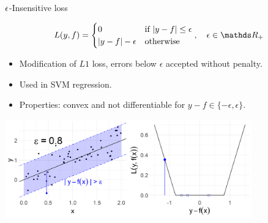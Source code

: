 \documentclass[11pt,compress,t,notes=noshow, xcolor=table]{beamer}
\begin{document}
\begin{vbframe}{$\epsilon$-Insensitive loss}

\vspace*{-0.3cm}
$$
L(y,f) =  \begin{cases}
  0  & \text{if } |y - f| \le \epsilon \\
  |y - f|-\epsilon & \text{otherwise }
  \end{cases}, \quad \epsilon \in \R_{+}
$$
\begin{itemize}
\item Modification of $L1$ loss, errors below $\epsilon$ accepted without penalty.
\item Used in SVM regression.
\item Properties: convex and not differentiable for $ y - f \in \{-\epsilon, \epsilon\}$.
\end{itemize}

\vfill

\begin{center}
\includegraphics[width = 0.8\textwidth]{figure/loss_eps_insensitive.png}
\end{center}

\end{vbframe}




\end{document}
